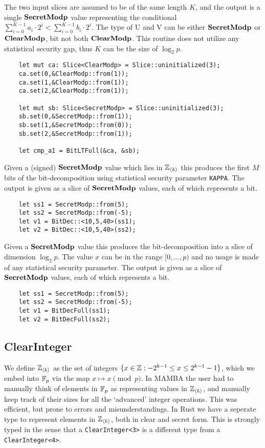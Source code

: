 The two input slices are assumed to be of the same length $K$, and 
the output is a single $\mathbf{SecretModp}$ value representing the conditional
$\sum_{i=0}^{K-1} a_i \cdot 2^i < \sum_{i=0}^{K-1} b_i \cdot 2^i$.
The type of U and V can be either $\mathbf{SecretModp}$ or $\mathbf{ClearModp}$,
bit not both $\mathbf{ClearModp}$.
This routine does not utilize any statistical security gap, thus
$K$ can be the size of $\log_2 p$.
\begin{lstlisting}
    let mut ca: Slice<ClearModp> = Slice::uninitialized(3);
    ca.set(0,&ClearModp::from(1));
    ca.set(1,&ClearModp::from(1));
    ca.set(2,&ClearModp::from(1));

    let mut sb: Slice<SecretModp> = Slice::uninitialized(3);
    sb.set(0,&SecretModp::from(1));
    sb.set(1,&SecretModp::from(0));
    sb.set(2,&SecretModp::from(1));

    let cmp_a1 = BitLTFull(&ca, &sb);
\end{lstlisting}

Given a (signed) $\mathbf{SecretModp}$ value which lies in ${\mathbb{Z}}_{\langle k \rangle}$
this produces the first $M$ bits of the bit-decomposition using 
statistical security parameter \verb|KAPPA|.
The output is given as a slice of $\mathbf{SecretModp}$ values, each
of which represents a bit.
\begin{lstlisting}
    let ss1 = SecretModp::from(5);
    let ss2 = SecretModp::from(-5);
    let v1 = BitDec::<10,5,40>(ss1);
    let v2 = BitDec::<10,5,40>(ss2);
\end{lstlisting}

Given a $\mathbf{SecretModp}$ value this produces the bit-decomposition
into a slice of dimension $\log_2 p$.
The value $x$ can be in the range $[0,\ldots,p)$ and no usage
is made of any statistical security parameter.
The output is given as a slice of $\mathbf{SecretModp}$ values, each
of which represents a bit.
\begin{lstlisting}
    let ss1 = SecretModp::from(5);
    let ss2 = SecretModp::from(-5);
    let v1 = BitDecFull(ss1);
    let v2 = BitDecFull(ss2);
\end{lstlisting}


\subsection{ClearInteger}
We define ${\mathbb{Z}}_{\langle k \rangle}$ as the set of integers $\{x \in {\mathbb{Z}}: -2^{k-1} \le x \le 2^{k-1}-1\}$,
which we embed into ${\mathbb{F}}_p$ via the map $x \mapsto x \pmod{p}$.
In MAMBA the user had to manually think of elements in ${\mathbb{F}}_p$
as representing values in ${\mathbb{Z}}_{\langle k \rangle}$, and manually keep track of their
sizes for all the `advanced' integer operations.
This was efficient, but prone to errors and misunderstandings.
In Rust we have a seperate type to represent elements in ${\mathbb{Z}}_{\langle k \rangle}$,
both in clear and secret form.
This is strongly typed in the sense that a
\verb|ClearInteger<3>|  is a different type from a
\verb|ClearInteger<4>|.

